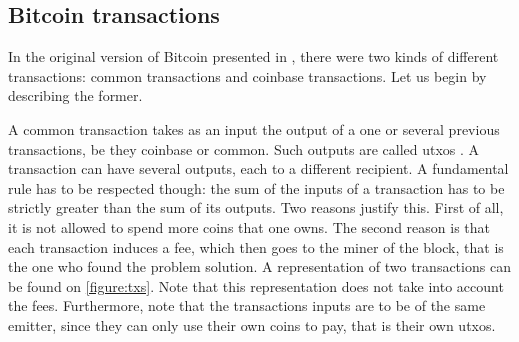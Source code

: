       \subsection{Bitcoin transactions}
        \label{subsec:txs}
        In the original version of Bitcoin presented in \cite{Bitcoin}, there  were two kinds of different transactions: common transactions and coinbase transactions. Let us begin by describing the former.
        
        A common transaction takes as an input the output of a one or several previous transactions, be they coinbase or common. Such outputs are called \glspl{utxo} \cite{Survey}. A transaction can have several outputs, each to a different recipient. A fundamental rule has to be respected though: the sum of the inputs of a transaction has to be strictly greater than the sum of its outputs. Two reasons justify this. First of all, it is not allowed to spend more coins that one owns. The second reason is that each transaction induces a fee, which then goes to the miner of the block, that is the one who found the problem solution. A representation of two transactions can be found on \autoref{figure:txs}. Note that this representation does not take into account the fees. Furthermore, note that the transactions inputs are to be of the same emitter, since they can only use their own coins to pay, that is their own \glspl{utxo}.
        
